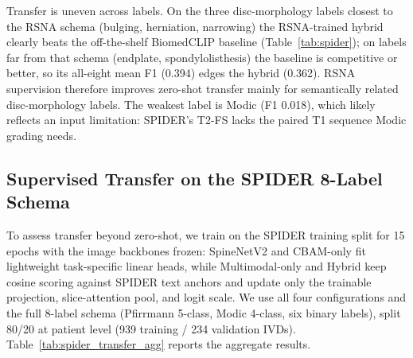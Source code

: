\documentclass[runningheads]{llncs}
\begin{document}
Transfer is uneven across labels. On the three disc-morphology labels closest to the RSNA schema (bulging, herniation, narrowing) the RSNA-trained hybrid clearly beats the off-the-shelf BiomedCLIP baseline (Table~\ref{tab:spider}); on labels far from that schema (endplate, spondylolisthesis) the baseline is competitive or better, so its all-eight mean F1 (0.394) edges the hybrid (0.362). RSNA supervision therefore improves zero-shot transfer mainly for semantically related disc-morphology labels. The weakest label is Modic (F1 0.018), which likely reflects an input limitation: SPIDER's T2-FS lacks the paired T1 sequence Modic grading needs.

\subsection{Supervised Transfer on the SPIDER 8-Label Schema}
\label{sec:spider_transfer}

To assess transfer beyond zero-shot, we train on the SPIDER training split for 15 epochs with the image backbones frozen: SpineNetV2 and CBAM-only fit lightweight task-specific linear heads, while Multimodal-only and Hybrid keep cosine scoring against SPIDER text anchors and update only the trainable projection, slice-attention pool, and logit scale. We use all four configurations and the full 8-label schema (Pfirrmann 5-class, Modic 4-class, six binary labels), split 80/20 at patient level (939 training / 234 validation IVDs). Table~\ref{tab:spider_transfer_agg} reports the aggregate results.
\end{document}
